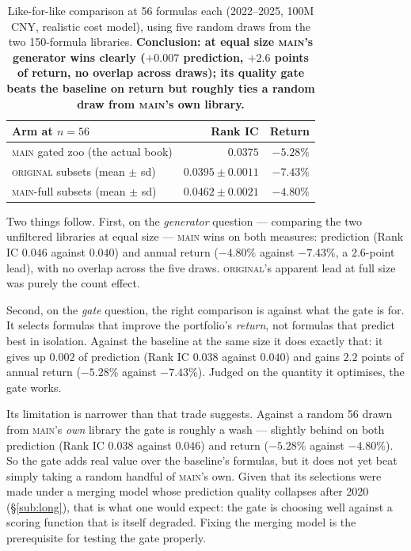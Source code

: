 \documentclass[11pt]{article}
\newcommand{\main}{\textsc{main}}
\newcommand{\orig}{\textsc{original}}
\begin{document}
\begin{table}[h]
\centering\small
\begin{tabular}{lrr}
\toprule
Arm at $n=56$ & Rank IC & Return \\
\midrule
\main{} gated zoo (the actual book)   & $0.0375$          & $\bm{-5.28\%}$ \\
\orig{} subsets (mean $\pm$ sd)       & $\bm{0.0395 \pm 0.0011}$ & $-7.43\%$ \\
\main{}-full subsets (mean $\pm$ sd)  & $0.0462 \pm 0.0021$ & $-4.80\%$ \\
\bottomrule
\end{tabular}
\caption{Like-for-like comparison at 56 formulas each (2022--2025, 100M CNY, realistic
cost model), using five random draws from the two 150-formula libraries.
\textbf{Conclusion: at equal size \main{}'s generator wins clearly ($+0.007$ prediction,
$+2.6$ points of return, no overlap across draws); its quality gate beats the baseline
on return but roughly ties a random draw from \main{}'s own library.}}
\label{tab:count-matched}
\end{table}

\noindent Two things follow. First, on the \emph{generator} question --- comparing the
two unfiltered libraries at equal size --- \main{} wins on both measures: prediction
(Rank IC $0.046$ against $0.040$) and annual return ($-4.80\%$ against $-7.43\%$, a
$2.6$-point lead), with no overlap across the five draws. \orig{}'s apparent lead at
full size was purely the count effect.

Second, on the \emph{gate} question, the right comparison is against what the gate is
for. It selects formulas that improve the portfolio's \emph{return}, not formulas that
predict best in isolation. Against the baseline at the same size it does exactly that:
it gives up $0.002$ of prediction (Rank IC $0.038$ against $0.040$) and gains $2.2$
points of annual return ($-5.28\%$ against $-7.43\%$). Judged on the quantity it
optimises, the gate works.

Its limitation is narrower than that trade suggests. Against a random 56 drawn from
\main{}'s \emph{own} library the gate is roughly a wash --- slightly behind on both
prediction (Rank IC $0.038$ against $0.046$) and return ($-5.28\%$ against $-4.80\%$).
So the gate adds real value over the baseline's formulas, but it does not yet beat
simply taking a random handful of \main{}'s own. Given that its selections were made
under a merging model whose prediction quality collapses after 2020
(\S\ref{sub:long}), that is what one would expect: the gate is choosing well against a
scoring function that is itself degraded. Fixing the merging model is the prerequisite
for testing the gate properly.
\end{document}
